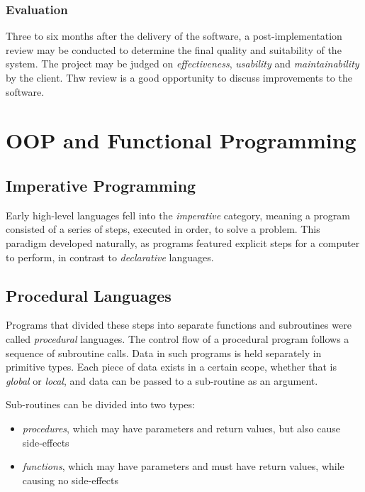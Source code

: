 \documentclass[9pt]{article}
\let\oldsection\section
\renewcommand\section{\clearpage\oldsection}
\begin{document}
\subsubsection{Evaluation}
\label{sec:org773c6b1}

Three to six months after the delivery of the software, a post-implementation review may be conducted to determine the final quality and suitability of the system. The project may be judged on \emph{effectiveness}, \emph{usability} and \emph{maintainability} by the client. Thw review is a good opportunity to discuss improvements to the software.

\section{OOP and Functional Programming}
\label{sec:org73c8e48}
\subsection{Imperative Programming}
\label{sec:org6db8231}

Early high-level languages fell into the \emph{imperative} category, meaning a program consisted of a series of steps, executed in order, to solve a problem. This paradigm developed naturally, as programs featured explicit steps for a computer to perform, in contrast to \emph{declarative} languages.

\subsection{Procedural Languages}
\label{sec:orgc1520f7}

Programs that divided these steps into separate functions and subroutines were called \emph{procedural} languages. The control flow of a procedural program follows a sequence of subroutine calls. Data in such programs is held separately in primitive types. Each piece of data exists in a certain scope, whether that is \emph{global} or \emph{local}, and data can be passed to a sub-routine as an argument.

Sub-routines can be divided into two types:

\begin{itemize}
\item \emph{procedures}, which may have parameters and return values, but also cause side-effects
\item \emph{functions}, which may have parameters and must have return values, while causing no side-effects
\end{itemize}
\end{document}
